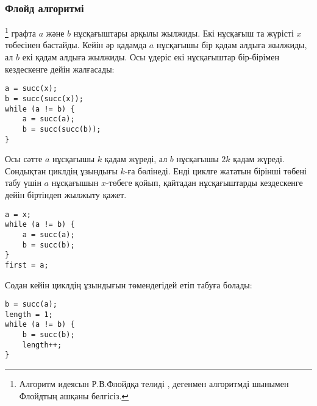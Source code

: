 \subsubsection{Флойд алгоритмі}


\footnote{Алгоритм идеясын Р.В.Флойдқа телиді \cite{knu982}, дегенмен алгоритмді шынымен Флойдтың   ашқаны белгісіз.}
графта $a$ және $b$ нұсқағыштары арқылы жылжиды. Екі нұсқағыш та
жүрісті $x$ төбесінен бастайды. Кейін әр қадамда $a$ нұсқағышы
бір қадам алдыға жылжиды, ал $b$ екі қадам алдыға жылжиды. Осы үдеріс
екі нұсқағыштар бір-бірімен кездескенге дейін жалғасады:
\begin{lstlisting}
a = succ(x);
b = succ(succ(x));
while (a != b) {
    a = succ(a);
    b = succ(succ(b));
}
\end{lstlisting}

Осы сәтте $a$ нұсқағышы $k$ қадам жүреді, ал $b$ нұсқағышы
$2k$ қадам жүреді. Сондықтан циклдің ұзындығы $k$-ға  бөлінеді. Енді
циклге жататын бірінші төбені табу үшін $a$ нұсқағышын $x$-төбеге қойып,
қайтадан нұсқағыштарды кездескенге дейін біртіндеп жылжыту қажет.

\begin{lstlisting}
a = x;
while (a != b) {
    a = succ(a);
    b = succ(b);
}
first = a;
\end{lstlisting}

Содан кейін циклдің ұзындығын төмендегідей етіп табуға болады:
\begin{lstlisting}
b = succ(a);
length = 1;
while (a != b) {
    b = succ(b);
    length++;
}
\end{lstlisting}
